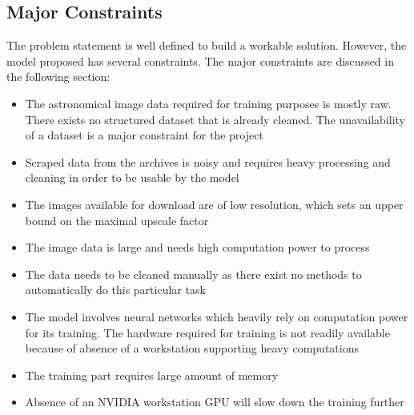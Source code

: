 \documentclass[oneside,a4paper,12pt]{report}
\begin{document}
\subsection{Major Constraints}
\hspace*{0.25 in}The problem statement is well defined to build a workable solution. However, the model proposed has several constraints. The major constraints are discussed in the following section:
\begin{itemize}
\item The astronomical image data required for training purposes is mostly raw. There exists no structured dataset that is already cleaned. The unavailability of a dataset is a major constraint for the project
\item Scraped data from the archives is noisy and requires heavy processing and cleaning in order to be usable by the model
\item The images available for download are of low resolution, which sets an upper bound on the maximal upscale factor
\item The image data is large and needs high computation power to process
\item The data needs to be cleaned manually as there exist no methods to automatically do this particular task
\item The model involves neural networks which heavily rely on computation power for its training. The hardware required for training is not readily available because of absence of a workstation supporting heavy computations
\item The training part requires large amount of memory
\item Absence of an NVIDIA workstation GPU will slow down the training further
\end{itemize}
\end{document}
